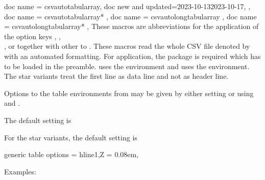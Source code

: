 \documentclass[a4paper,11pt]{ltxdoc}
\begin{document}
\begin{docCommands}[
    doc parameter = \oarg{options}\marg{file name}\oarg{taboptions 1}\oarg{taboptions 2},
  ]
  {
    { doc name = csvautotabularray, doc new and updated={2023-10-13}{2023-10-17}, },
    { doc name = csvautotabularray* },
    { doc name = csvautolongtabularray  },
    { doc name = csvautolongtabularray* },
  }
  These macros are abbreviations for the application of the option keys
  , ,\\
  , or 
  together with other  to .
  These macros read the whole CSV file denoted by 
  with an automated formatting.
  For application, the package  is required which has to be
  loaded in the preamble.
   uses the  environment and
   uses the  environment.
  The star variants treat the first line as data line and not as header line.\par
  Options to the table environments from  may be given
  by either setting  or
  using  and .\par
  The default setting is
  For the star variants, the default setting is
\begin{dispListing}
generic table options =
  { {
    hline{1,Z} = {0.08em},
  } }
\end{dispListing}

Examples:

\begin{dispExample}
\end{dispExample}

\begin{dispExample}
\end{dispExample}


\end{docCommands}
\end{document}

